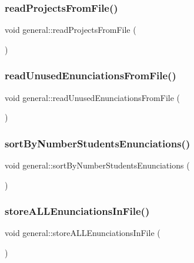 \subsubsection{\texorpdfstring{read\+Projects\+From\+File()}{readProjectsFromFile()}}
{\footnotesize\ttfamily void general\+::read\+Projects\+From\+File (\begin{DoxyParamCaption}{ }\end{DoxyParamCaption})}

\mbox{\label{classgeneral_a724d4f6e483cb27fa54a1116586fb496}} 
\subsubsection{\texorpdfstring{read\+Unused\+Enunciations\+From\+File()}{readUnusedEnunciationsFromFile()}}
{\footnotesize\ttfamily void general\+::read\+Unused\+Enunciations\+From\+File (\begin{DoxyParamCaption}{ }\end{DoxyParamCaption})}

\mbox{\label{classgeneral_a26dad8e6e689397eecb104c55add42b6}} 
\subsubsection{\texorpdfstring{sort\+By\+Number\+Students\+Enunciations()}{sortByNumberStudentsEnunciations()}}
{\footnotesize\ttfamily void general\+::sort\+By\+Number\+Students\+Enunciations (\begin{DoxyParamCaption}{ }\end{DoxyParamCaption})}

\mbox{\label{classgeneral_a49c62bf38d045b169a808f573b55c40b}} 
\subsubsection{\texorpdfstring{store\+A\+L\+L\+Enunciations\+In\+File()}{storeALLEnunciationsInFile()}}
{\footnotesize\ttfamily void general\+::store\+A\+L\+L\+Enunciations\+In\+File (\begin{DoxyParamCaption}{ }\end{DoxyParamCaption})}

